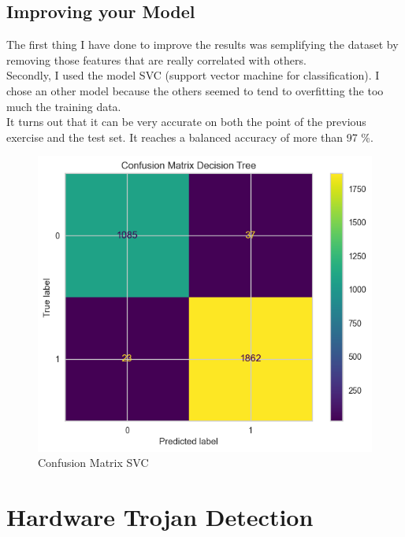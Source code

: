 \documentclass[unicode,11pt,a4paper,oneside,numbers=endperiod,openany]{scrartcl}
\begin{document}
\subsection{Improving your Model}
The first thing I have done to improve the results was semplifying the dataset by removing those features that are really correlated with others. \\
Secondly, I used the model SVC (support vector machine for classification). I chose an other model because the others seemed to tend to overfitting the too much the training data.\\
 It turns out that it can be very accurate on both the point of the previous exercise and the test set. It reaches a balanced accuracy of more than 97 \%. 
\begin{figure}[H]
  \centering
  \includegraphics[scale=0.5]{images/SVCconfusionMatrix.png}
  \caption{Confusion Matrix SVC}
\end{figure}
\section{Hardware Trojan Detection}
\end{document}
